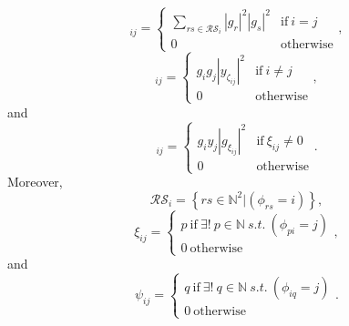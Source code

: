 \documentclass[useAMS,usenatbib]{mn2e}
\newcommand{\bE}{\bmath{E}}
\newcommand{\bF}{\bmath{F}}
\begin{document}
\begin{equation}
[\bE]_{ij} = 
\begin{cases}
 \sum_{rs \in \mathcal{RS}_i} \left | g_r \right |^2 \left | g_s \right |^2  & \textrm{if} ~ i=j\\
 0 & \textrm{otherwise}
\end{cases},
\end{equation}
\begin{equation}
[\bF]_{ij} = 
\begin{cases}
 g_i g_j  \left | y_{\zeta_{ij}} \right |^2  & \textrm{if} ~ i \neq j\\
 0 & \textrm{otherwise}
\end{cases},
\end{equation}
and
\begin{equation}
[\boldsymbol{G}]_{ij} = 
\begin{cases}
 g_i y_j  \left | g_{\xi_{ij}} \right |^2  & \textrm{if} ~ \xi_{ij}\neq0\\
 0 & \textrm{otherwise}
\end{cases}.
\end{equation}
Moreover, 
\begin{equation}
\mathcal{RS}_i = \left\{rs\in\mathbb{N}^2|(\phi_{rs} = i) \right\},
\end{equation}
\begin{equation}
\xi_{ij} = 
\begin{cases}
p~\textrm{if}~\exists! ~ p \in \mathbb{N} ~ s.t. ~(\phi_{pi} = j)\\
0~\textrm{otherwise}
\end{cases},
\end{equation}
and
\begin{equation}
\psi_{ij} = 
\begin{cases}
q~\textrm{if}~\exists! ~ q \in \mathbb{N} ~ s.t. ~(\phi_{iq} = j)\\
0~\textrm{otherwise}
\end{cases}.
\end{equation}
\end{document}
